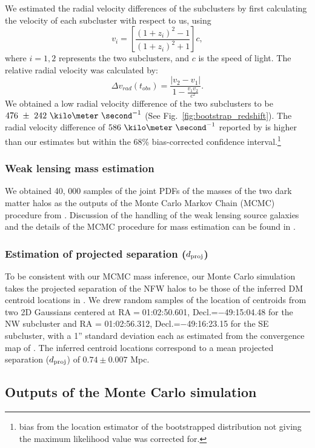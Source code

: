 \documentclass[letterpaper,useAMS,usenatbib]{mn2e}
\begin{document}
We estimated the radial velocity differences of the
subclusters by first calculating the velocity of each subcluster with
respect to us, using  
\begin{equation}
	v_i = \left[ \frac{(1+z_i)^2 - 1 }{(1+z_i)^2 + 1 }\right]c,
\end{equation}
where $i=1, 2$ represents the two subclusters, and $c$ is the speed of
light. The relative radial velocity was calculated by: 
\begin{equation}
	\Delta v_{rad}(t_{obs}) = \frac{|v_2 - v_1|}{1-\frac{v_1 v_2}{c^2}}.
\end{equation}
We obtained a low radial velocity difference of the two subclusters to be
$476~\pm~242~\kilo\meter~\second^{-1}$ (See Fig.~\ref{fig:bootstrap_redshift}). 
The radial velocity difference of $586~\kilo \meter~\second^{-1}$ reported by  
is higher than our estimates but within the 68\% bias-corrected
confidence interval.\footnote{bias from the location estimator of
	the bootstrapped distribution not giving the maximum likelihood value was
corrected for.} 
\subsubsection{Weak lensing mass estimation} 
We obtained 40, 000 samples of the joint PDFs of the masses of the two dark
matter halos as the outputs of the Monte Carlo Markov Chain (MCMC)
procedure from \citealt{Jee13}. Discussion of the handling of the weak
lensing source galaxies and the details of the MCMC procedure for mass
estimation can be found in \citealt{Jee13}. 
\subsubsection{Estimation of projected separation ($d_{\rm proj}$)} 
To be consistent with our MCMC mass inference, our Monte Carlo simulation takes 
the projected separation of the NFW halos to be those of the inferred
DM centroid locations in \citealt{Jee13}. We drew random samples
 of the location of centroids from two 2D Gaussians centered at
 RA$=$01:02:50.601, Decl.=$-$49:15:04.48 for the NW subcluster and RA =
 01:02:56.312, Decl.=$-$49:16:23.15 for the SE
subcluster, with a 1'' standard deviation each as estimated from the
convergence map of \citet{Jee13}. The
inferred centroid locations correspond to a mean projected separation
($d_{\rm proj}$) of $0.74\pm {0.007}$ Mpc. 
\subsection{Outputs of the Monte Carlo simulation}\label{sec:outputs}
%
\end{document}
